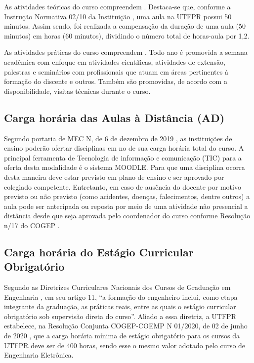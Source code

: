 As atividades teóricas do curso compreendem . Destaca-se que, conforme a Instrução Normativa 02/10 da Instituição \cite{in2:2010:prograd}, uma aula na UTFPR possui 50 minutos. Assim sendo, foi realizada a compensação da duração de uma aula (50 minutos) em horas (60 minutos), dividindo o número total de horas-aula por 1,2.


As atividades práticas do curso compreendem . Todo ano é promovida a semana acadêmica com enfoque em atividades científicas, atividades de extensão, palestras e seminários com profissionais que atuam em áreas pertinentes à formação do discente e outros. Também são promovidas, de acordo com a disponibilidade, visitas técnicas durante o curso.

\subsection{Carga horária das Aulas à Distância (AD)}

Segundo portaria de MEC N, de 6 de dezembro de 2019 \cite{portaria2117mec}, as instituições de ensino poderão ofertar disciplinas em no  de sua carga horária total do curso. A principal ferramenta de Tecnologia de informação e comunicação (TIC) para a oferta desta modalidade é o sistema MOODLE. Para que uma disciplina ocorra desta maneira deve estar previsto em plano de ensino e ser aprovado por colegiado competente. Entretanto, em caso de ausência do docente por motivo previsto ou não previsto (como acidentes, doenças, falecimentos, dentre outros) a aula pode ser antecipada ou reposta por meio de uma atividade não presencial a distância desde que seja aprovada pelo coordenador do curso conforme Resolução n/17 do COGEP \cite{cogep84}.


\subsection{Carga horária do Estágio Curricular Obrigatório}

Segundo as Diretrizes Curriculares Nacionais dos Cursos de Graduação em Engenharia \cite{dcneng}, em seu artigo 11, ``a formação  do  engenheiro  inclui,  como  etapa  integrante da  graduação, as práticas reais, entre as quais o estágio curricular obrigatório sob supervisão direta do curso''. Aliado a essa diretriz, a UTFPR estabelece, na Resolução Conjunta COGEP-COEMP N\textordmasculine{} 01/2020, de 02 de junho de 2020 \cite{cogepcoemp1:2020}, que a carga horária mínima de estágio obrigatório para os cursos da UTFPR deve ser de 400 horas, sendo esse o mesmo valor adotado pelo curso de Engenharia Eletrônica.

